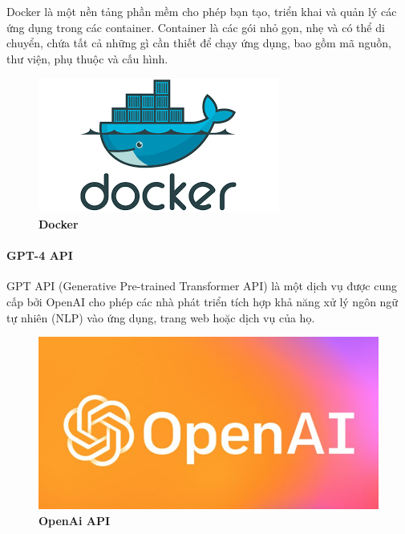 Docker là một nền tảng phần mềm cho phép bạn tạo, triển khai và quản lý các ứng dụng trong các container. Container là các gói nhỏ gọn, nhẹ và có thể di chuyển, chứa tất cả những gì cần thiết để chạy ứng dụng, bao gồm mã nguồn, thư viện, phụ thuộc và cấu hình.

\begin{figure}[H]
  \centering
  \includegraphics[scale=0.8]{Images/server/deploy/docker.png}
  \caption[Docker]{\bfseries \fontsize{12pt}{0pt}
  \selectfont Docker}
  \label{docker} %
\end{figure}


\paragraph{GPT-4 API}
\mbox{}

GPT API (Generative Pre-trained Transformer API) 
là một dịch vụ được cung cấp bởi OpenAI cho phép các nhà phát triển tích hợp khả năng xử lý ngôn ngữ tự nhiên (NLP) vào ứng dụng, 
trang web hoặc dịch vụ của họ. 

\begin{figure}[H]
  \centering
  \includegraphics[scale=0.9]{Images/server/ai/openai.png}
  \caption[OpenAi API]{\bfseries \fontsize{12pt}{0pt}
  \selectfont OpenAi API}
  \label{openai} %
\end{figure}


